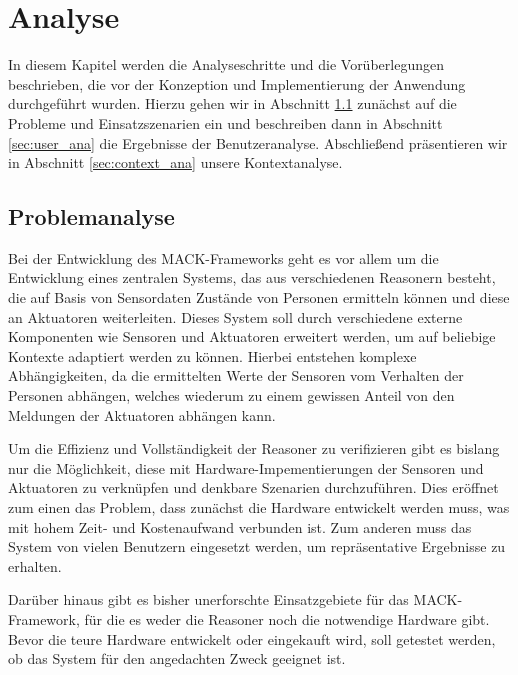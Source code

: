 \chapter{Analyse}\label{chapter:analysis}
In diesem Kapitel werden die Analyseschritte und die Vorüberlegungen beschrieben, die vor der Konzeption und Implementierung der Anwendung durchgeführt wurden. Hierzu gehen wir in Abschnitt \ref{sec:problem_ana} zunächst auf die Probleme und Einsatzszenarien ein und beschreiben dann in Abschnitt \ref{sec:user_ana} die Ergebnisse der Benutzeranalyse. Abschließend präsentieren wir in Abschnitt \ref{sec:context_ana} unsere Kontextanalyse.


\section{Problemanalyse}\label{sec:problem_ana}
Bei der Entwicklung des MACK-Frameworks geht es vor allem um die Entwicklung eines zentralen Systems, das aus verschiedenen Reasonern besteht, die auf Basis von Sensordaten Zustände von Personen ermitteln können und diese an Aktuatoren weiterleiten. Dieses System soll durch verschiedene externe Komponenten wie Sensoren und Aktuatoren erweitert werden, um auf beliebige Kontexte adaptiert werden zu können. Hierbei entstehen komplexe Abhängigkeiten, da die ermittelten Werte der Sensoren vom Verhalten der Personen abhängen, welches wiederum zu einem gewissen Anteil von den Meldungen der Aktuatoren abhängen kann.

Um die Effizienz und Vollständigkeit der Reasoner zu verifizieren gibt es bislang nur die Möglichkeit, diese mit Hardware-Impementierungen der Sensoren und Aktuatoren zu verknüpfen und denkbare Szenarien durchzuführen. Dies eröffnet zum einen das Problem, dass zunächst die Hardware entwickelt werden muss, was mit hohem Zeit- und Kostenaufwand verbunden ist. Zum anderen muss das System von vielen Benutzern eingesetzt werden, um repräsentative Ergebnisse zu erhalten.

Darüber hinaus gibt es bisher unerforschte Einsatzgebiete für das MACK-Framework, für die es weder die Reasoner noch die notwendige Hardware gibt. Bevor die teure Hardware entwickelt oder eingekauft wird, soll getestet werden, ob das System für den angedachten Zweck geeignet ist.


